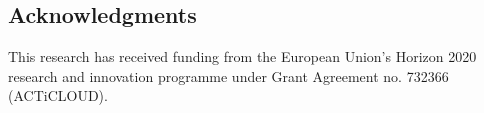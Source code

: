 \documentclass{cidr-2019}
\begin{document}


\subsection*{Acknowledgments} This research has received funding from the European Union's Horizon 2020 research and innovation programme under Grant Agreement no. 732366 (ACTiCLOUD).

{\small   }
\end{document}
